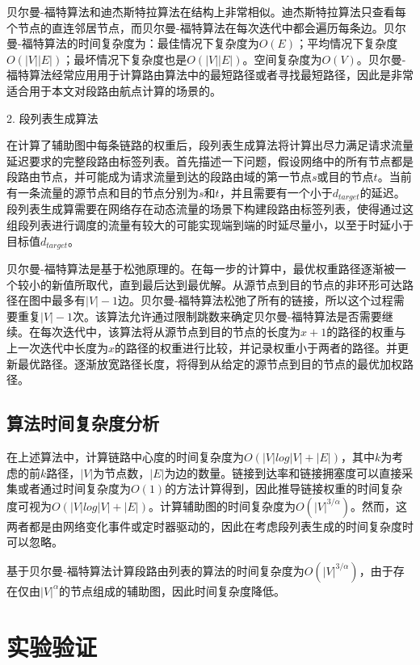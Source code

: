 贝尔曼-福特算法和迪杰斯特拉算法在结构上非常相似。迪杰斯特拉算法只查看每个节点的直连邻居节点，而贝尔曼-福特算法在每次迭代中都会遍历每条边。贝尔曼-福特算法的时间复杂度为：最佳情况下复杂度为$O(E)$；平均情况下复杂度$O(|V||E|)$；最坏情况下复杂度也是$O(|V||E|)$。空间复杂度为$O(V)$。贝尔曼-福特算法经常应用用于计算路由算法中的最短路径或者寻找最短路径，因此是非常适合用于本文对段路由航点计算的场景的。

2. 段列表生成算法

在计算了辅助图中每条链路的权重后，段列表生成算法将计算出尽力满足请求流量延迟要求的完整段路由标签列表。首先描述一下问题，假设网络中的所有节点都是段路由节点，并可能成为请求流量到达的段路由域的第一节点$s$或目的节点$t$。当前有一条流量的源节点和目的节点分别为$s$和$t$，并且需要有一个小于$d_{target}$的延迟。段列表生成算需要在网络存在动态流量的场景下构建段路由标签列表，使得通过这组段列表进行调度的流量有较大的可能实现端到端的时延尽量小，以至于时延小于目标值$d_{target}$。

贝尔曼-福特算法是基于松弛原理的。在每一步的计算中，最优权重路径逐渐被一个较小的新值所取代，直到最后达到最优解。从源节点到目的节点的非环形可达路径在图中最多有$|V|-1$边。贝尔曼-福特算法松弛了所有的链接，所以这个过程需要重复$|V|-1$次。该算法允许通过限制跳数来确定贝尔曼-福特算法是否需要继续。在每次迭代中，该算法将从源节点到目的节点的长度为$x+1$的路径的权重与上一次迭代中长度为$x$的路径的权重进行比较，并记录权重小于两者的路径。并更新最优路径。逐渐放宽路径长度，将得到从给定的源节点到目的节点的最优加权路径。

\subsection{算法时间复杂度分析}

在上述算法中，计算链路中心度的时间复杂度为$O(|V|log|V|+|E|)$，其中$k$为考虑的前$k$路径，$|V|$为节点数，$|E|$为边的数量。链接到达率和链接拥塞度可以直接采集或者通过时间复杂度为$O(1)$的方法计算得到，因此推导链接权重的时间复杂度可视为$O(|V|log|V|+|E|)$。计算辅助图的时间复杂度为$O({|V|}^{3/\alpha})$。然而，这两者都是由网络变化事件或定时器驱动的，因此在考虑段列表生成的时间复杂度时可以忽略。

基于贝尔曼-福特算法计算段路由列表的算法的时间复杂度为$O({|V|}^{3/\alpha})$，由于存在仅由${|V|}^\alpha$的节点组成的辅助图，因此时间复杂度降低。

\section{实验验证}

